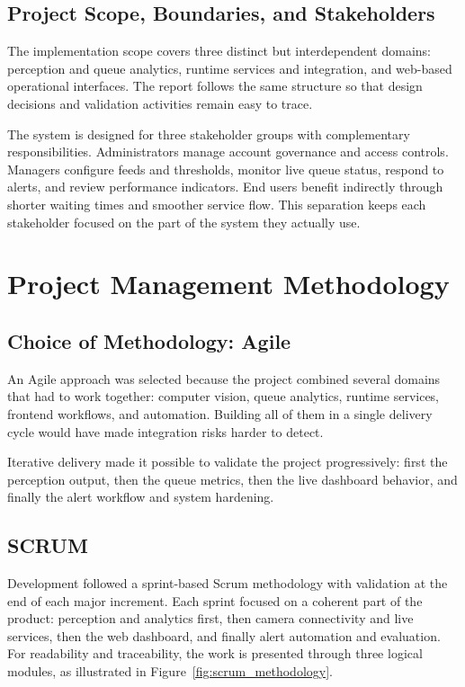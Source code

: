 \subsection{Project Scope, Boundaries, and Stakeholders}
The implementation scope covers three distinct but interdependent domains: perception and queue analytics, runtime services and integration, and web-based operational interfaces. The report follows the same structure so that design decisions and validation activities remain easy to trace.

The system is designed for three stakeholder groups with complementary responsibilities. Administrators manage account governance and access controls. Managers configure feeds and thresholds, monitor live queue status, respond to alerts, and review performance indicators. End users benefit indirectly through shorter waiting times and smoother service flow. This separation keeps each stakeholder focused on the part of the system they actually use.

\section{Project Management Methodology}

\subsection{Choice of Methodology: Agile}
An Agile approach was selected because the project combined several domains that had to work together: computer vision, queue analytics, runtime services, frontend workflows, and automation. Building all of them in a single delivery cycle would have made integration risks harder to detect.

Iterative delivery made it possible to validate the project progressively: first the perception output, then the queue metrics, then the live dashboard behavior, and finally the alert workflow and system hardening.

\subsection{SCRUM}
Development followed a sprint-based Scrum methodology with validation at the end of each major increment. Each sprint focused on a coherent part of the product: perception and analytics first, then camera connectivity and live services, then the web dashboard, and finally alert automation and evaluation. For readability and traceability, the work is presented through three logical modules, as illustrated in Figure~\ref{fig:scrum_methodology}.

